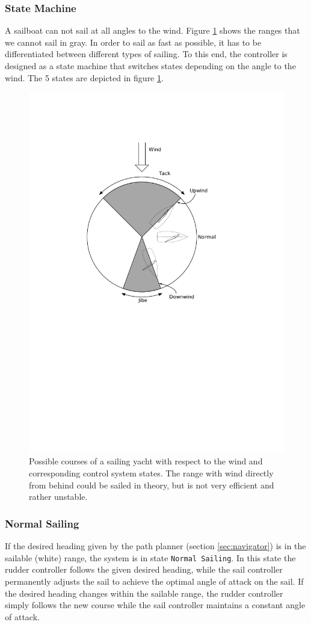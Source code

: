\subsubsection{State Machine}
A sailboat can not sail at all angles to the wind. Figure \ref{fig:courses_to_wind} shows the ranges that we cannot sail in gray. In order to sail as fast as possible, it has to be differentiated between different types of sailing. To this end, the controller is designed as a state machine that switches states depending on the angle to the wind. The 5 states are depicted in figure \ref{fig:courses_to_wind}.
\begin{figure}[htb]
\centering
\includegraphics[trim = 45mm 120mm 55mm 45mm, clip, width=0.70\columnwidth]{pics/courses_to_wind.pdf}
\caption{Possible courses of a sailing yacht with respect to the wind and corresponding control system states. The range with wind directly from behind could be sailed in theory, but is not very efficient and rather unstable.}\label{fig:courses_to_wind}
\end{figure}
\subsubsection{Normal Sailing}
If the desired heading given by the path planner (section \ref{sec:navigator}) is
in the sailable (white) range, the system is in state \texttt{Normal Sailing}.
In this state the rudder controller follows the given desired heading, while
the sail controller permanently adjusts the sail to achieve the optimal angle
of attack on the sail. If the desired heading changes within the sailable
range, the rudder controller simply follows the new course while the sail
controller maintains a constant angle of attack.
